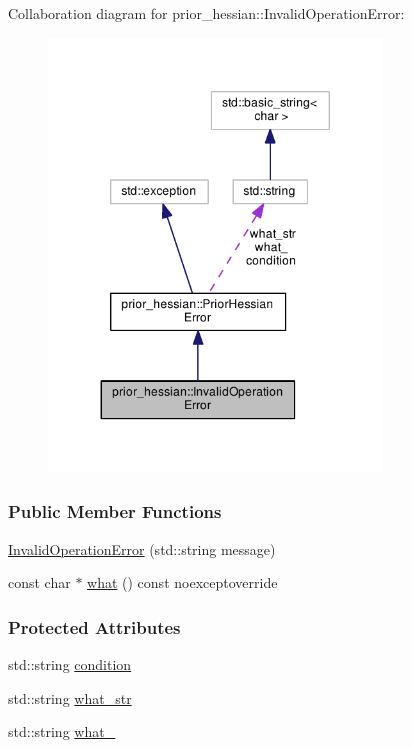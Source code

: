 Collaboration diagram for prior\+\_\+hessian\+:\+:Invalid\+Operation\+Error\+:\nopagebreak
\begin{figure}[H]
\begin{center}
\leavevmode
\includegraphics[width=251pt]{structprior__hessian_1_1InvalidOperationError__coll__graph}
\end{center}
\end{figure}
\subsubsection*{Public Member Functions}
\begin{DoxyCompactItemize}
\item 
\hyperlink{structprior__hessian_1_1InvalidOperationError_ad4fe76ff31dec10a0536bd523ee68ed0}{Invalid\+Operation\+Error} (std\+::string message)
\item 
const char $\ast$ \hyperlink{classprior__hessian_1_1PriorHessianError_a0d1812ff85f88f12c0fffd12f523263d}{what} () const noexceptoverride
\end{DoxyCompactItemize}
\subsubsection*{Protected Attributes}
\begin{DoxyCompactItemize}
\item 
std\+::string \hyperlink{classprior__hessian_1_1PriorHessianError_a0f00dbb23dc6ba9b3577503755b018c5}{condition}
\item 
std\+::string \hyperlink{classprior__hessian_1_1PriorHessianError_a0d97e1b6b1bcf6a440400706f416375e}{what\+\_\+str}
\item 
std\+::string \hyperlink{classprior__hessian_1_1PriorHessianError_a018e11b5863c2a3a06d37a16a89b14b2}{what\+\_\+}
\end{DoxyCompactItemize}



